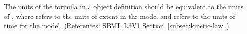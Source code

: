 The units of the  formula in a \KineticLaw object definition
should be equivalent to the units of , where
 refers to the units of extent in the model and
 refers to the units of time for the model.  (References:
SBML L3V1 Section~\ref{subsec:kinetic-law}.)
